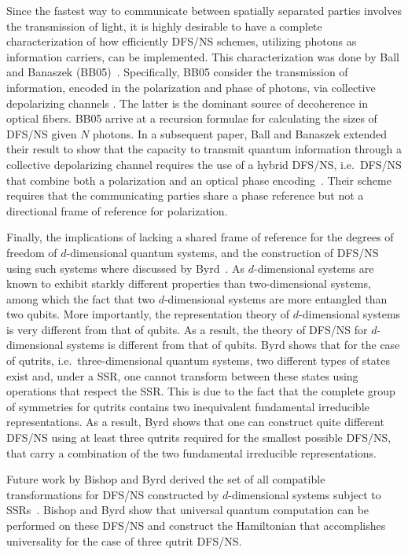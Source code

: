 Since the fastest way to communicate between spatially separated parties involves the transmission of light, it is highly desirable to have a complete characterization of how efficiently DFS/NS schemes, utilizing photons as information carriers, can be implemented.  This characterization was done by Ball and Banaszek (BB05)~\cite{BB05}.  Specifically, BB05 consider the transmission of information, encoded in the polarization and phase of photons, via collective depolarizing channels . The latter is the dominant source of decoherence in optical fibers.  BB05 arrive at a recursion formulae for calculating the sizes of DFS/NS given $N$ photons.  In a subsequent paper, Ball and Banaszek extended their result to show that the capacity to transmit quantum information through a collective depolarizing channel requires the use of a hybrid DFS/NS, i.e.~DFS/NS that combine both a polarization and an optical phase encoding~\cite{BB06}. Their scheme requires that the communicating parties share a phase reference but not a directional frame of reference for polarization.  

Finally, the implications of lacking a shared frame of reference for the degrees of freedom of $d$-dimensional quantum systems, and the construction of DFS/NS using such systems where discussed by Byrd~\cite{B06}.  As $d$-dimensional systems are known to exhibit starkly different properties than two-dimensional systems, among which the fact that two $d$-dimensional systems are more entangled than two qubits.  More importantly, the representation theory of $d$-dimensional systems is very different from that of qubits.  As a result, the theory of DFS/NS for $d$-dimensional systems is different from that of qubits.  Byrd shows that for the case of qutrits, i.e.~three-dimensional quantum systems, two different types of states exist and, under a SSR, one cannot transform between these states using operations that respect the SSR.  This is due to the fact that the complete group of symmetries for qutrits contains two inequivalent fundamental irreducible representations. As a result, Byrd shows that one can construct quite different DFS/NS using at least three qutrits required for the smallest possible DFS/NS, that carry a combination of the two fundamental irreducible representations.  

Future work by Bishop and Byrd derived the set of all compatible transformations for DFS/NS constructed by $d$-dimensional systems subject to SSRs~\cite{BB09}.  Bishop and Byrd show that universal quantum computation can be performed on these DFS/NS and construct the Hamiltonian that accomplishes universality for the case of three qutrit DFS/NS.

